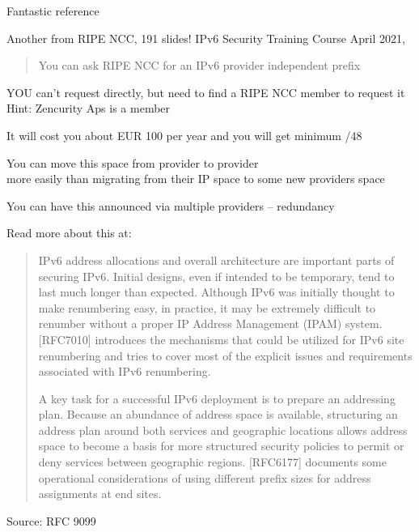\documentclass[Screen16to9,17pt]{foils}
\begin{document}
\begin{list2}
\item Fantastic reference
\item Another from RIPE NCC, 191 slides! IPv6 Security Training Course April 2021,\\
\end{list2}




\begin{quote}
You can ask RIPE NCC for an IPv6 provider independent prefix
\end{quote}

\begin{list2}
\item YOU can't request directly, but need to find a RIPE NCC member to request it\\
Hint: Zencurity Aps is a member
\item It will cost you about EUR 100 per year and you will get minimum /48
\item You can move this space from provider to provider\\
more easily than migrating from their IP space to some new providers space
\item You can have this announced via multiple providers -- redundancy
\item Read more about this at:\\
\end{list2}



\slide{}


\begin{quote}
IPv6 address allocations and overall architecture are important parts
   of securing IPv6.  Initial designs, even if intended to be temporary,
   tend to last much longer than expected.  Although IPv6 was initially
   thought to make renumbering easy, in practice, it may be extremely
   difficult to renumber without a proper IP Address Management (IPAM)
   system.  [RFC7010] introduces the mechanisms that could be utilized
   for IPv6 site renumbering and tries to cover most of the explicit
   issues and requirements associated with IPv6 renumbering.

   A key task for a successful IPv6 deployment is to prepare an
   addressing plan.  Because an abundance of address space is available,
   structuring an address plan around both services and geographic
   locations allows address space to become a basis for more structured
   security policies to permit or deny services between geographic
   regions.  [RFC6177] documents some operational considerations of
   using different prefix sizes for address assignments at end sites.
\end{quote}
Source: RFC 9099
\end{document}
